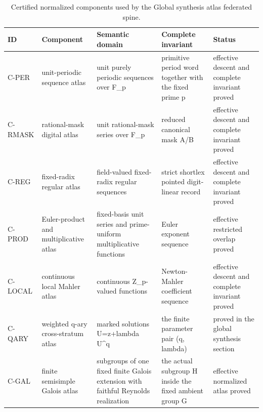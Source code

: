 \begin{table}[htbp]
\centering
\caption{Certified normalized components used by the Global synthesis atlas federated spine.}
\label{tab:block13-clusters}
\scriptsize
\begin{tabularx}{\textwidth}{@{}L{0.09\textwidth}L{0.18\textwidth}L{0.23\textwidth}L{0.25\textwidth}Y@{}}
\toprule
ID & Component & Semantic domain & Complete invariant & Status\\
\midrule
C-PER & unit-periodic sequence atlas & unit purely periodic sequences over F\_p & primitive period word together with the fixed prime p & effective descent and complete invariant proved\\
C-RMASK & rational-mask digital atlas & unit rational-mask series over F\_p & reduced canonical mask A/B & effective descent and complete invariant proved\\
C-REG & fixed-radix regular atlas & field-valued fixed-radix regular sequences & strict shortlex pointed digit-linear record & effective descent and complete invariant proved\\
C-PROD & Euler-product and multiplicative atlas & fixed-basis unit series and prime-uniform multiplicative functions & Euler exponent sequence & effective restricted overlap proved\\
C-LOCAL & continuous local Mahler atlas & continuous Z\_p-valued functions & Newton-Mahler coefficient sequence & effective descent and complete invariant proved\\
C-QARY & weighted q-ary cross-stratum atlas & marked solutions U=z+lambda U\textasciicircum{}q & the finite parameter pair (q, lambda) & proved in the global synthesis section\\
C-GAL & finite semisimple Galois atlas & subgroups of one fixed finite Galois extension with faithful Reynolds realization & the actual subgroup H inside the fixed ambient group G & effective normalized atlas proved\\
\bottomrule
\end{tabularx}
\end{table}
